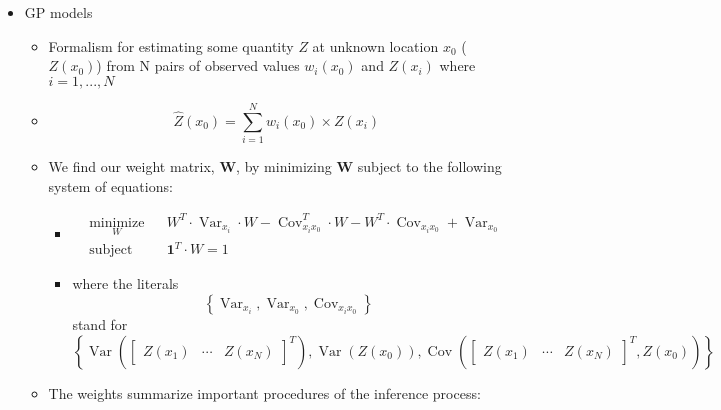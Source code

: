 \documentclass[aps,pre,nofootinbib,superscriptaddress,linenumbers,10pt, draft,tightenlines]{revtex4-1}
\begin{document}
\begin{itemize}
\begin{itemize}
\begin{itemize}
            \item GP models
            \begin{itemize}
            	\item Formalism for estimating some quantity $Z$ at
            	      unknown location $x_0$ ($Z\left(x_0\right)$) 
            	      from N pairs of observed values 
            	      $w_i\left(x_0\right)$ and $Z\left(x_i\right)$ where
            	      $i = 1,...,N$
                \item \begin{equation} \hat{Z}\left(x_0\right) =
                      \sum_{i=1}^N w_i\left(x_0\right) \times
                      Z\left(x_i\right) \end{equation}
                \item We find our weight matrix, \textbf{W}, by minimizing \textbf{W} subject to the following system of equations:
                \begin{itemize}
                	\item \begin{align}
                	&\underset{W}{\text{minimize}}& & W^T \cdot \operatorname{Var}_{x_i} \cdot W - \operatorname{Cov}_{x_ix_0}^T \cdot W - W^T \cdot \operatorname{Cov}_{x_ix_0} + \operatorname{Var}_{x_0} \\
                	&\text{subject to}
                	& &\mathbf{1}^T \cdot W = 1
                	\end{align}
                	\item where the literals \begin{equation}\left\{\operatorname{Var}_{x_i}, \operatorname{Var}_{x_0}, \operatorname{Cov}_{x_ix_0}\right\}\end{equation} stand for \begin{equation}
                	\left\{\operatorname{Var}\left(\begin{bmatrix}Z(x_1)&\cdots&Z(x_N)\end{bmatrix}^T\right), \operatorname{Var}(Z(x_0)), \operatorname{Cov} \left(\begin{bmatrix}Z(x_1)&\cdots&Z(x_N)\end{bmatrix}^T,Z(x_0)\right)\right\}\end{equation}
                \end{itemize}
                \item The weights summarize important procedures of the 
                      inference process:    	

\end{itemize}
\end{itemize}
\end{itemize}
\end{itemize}
\end{document}
